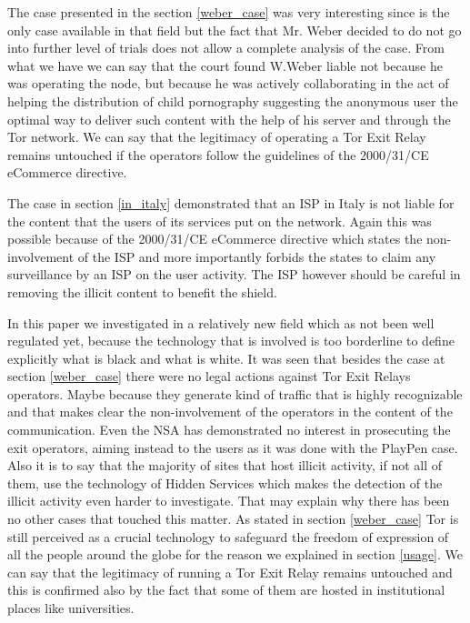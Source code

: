 \documentclass[runningheads,a4paper]{llncs}
\begin{document}
The case presented in the section \ref{weber_case} was very interesting since is the only case available in that field but the fact that Mr. Weber decided to do not go into further level of trials does not allow a complete analysis of the case. From what we have we can say that the court found W.Weber liable not because he was operating the node, but because he was actively collaborating in the act of helping the distribution of child pornography suggesting the anonymous user the optimal way to deliver such content with the help of his server and through the Tor network. We can say that the legitimacy of operating a Tor Exit Relay remains untouched if the operators follow the guidelines of the 2000/31/CE eCommerce directive.

The case in section \ref{in_italy} demonstrated that an ISP in Italy is not liable for the content that the users of its services put on the network. Again this was possible because of the 2000/31/CE eCommerce directive which states the non-involvement of the ISP and more importantly forbids the states to claim any surveillance by an ISP on the user activity. The ISP however should be careful in removing the illicit content to benefit the shield.

In this paper we investigated in a relatively new field which as not been well regulated yet, because the technology that is involved is too borderline to define explicitly what is black and what is white.
It was seen that besides the case at section \ref{weber_case} there were no legal actions against Tor Exit Relays operators. Maybe because they generate kind of traffic that is highly recognizable and that makes clear the non-involvement of the operators in the content of the communication.
Even the NSA has demonstrated no interest in prosecuting the exit operators, aiming instead to the users as it was done with the PlayPen case. Also it is to say that the majority of sites that host illicit activity, if not all of them, use the technology of Hidden Services which makes the detection of the illicit activity even harder to investigate. That may explain why there has been no other cases that touched this matter. As stated in section \ref{weber_case} Tor is still perceived as a crucial technology to safeguard the freedom of expression of all the people around the globe for the reason we explained in section \ref{usage}. We can say that the legitimacy of running a Tor Exit Relay remains untouched and this is confirmed also by the fact that some of them are hosted in institutional places like universities.
\end{document}
